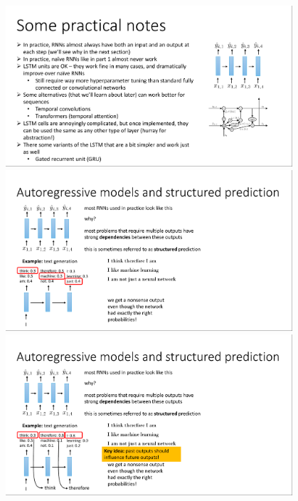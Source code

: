 \documentclass{book}
\begin{document}
\begin{figure}[H]
    \centering
    \includegraphics[width=0.95\textwidth]{images/lec10_16.png}
    \includegraphics[width=0.95\textwidth]{images/lec10_17.png}
    \includegraphics[width=0.95\textwidth]{images/lec10_18.png}
\end{figure}
\end{document}

